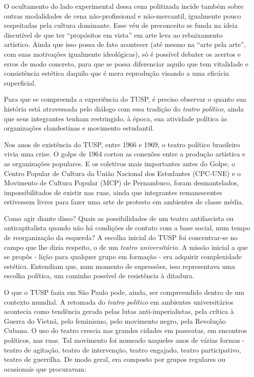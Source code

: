 O ocultamento do lado experimental dessa cena politizada incide também
sobre outras modalidades de cena não-profissional e não-mercantil,
igualmente pouco respeitadas pela cultura dominante. Esse véu de
preconceito se funda na ideia discutível de que ter “propósitos em
vista” em arte leva ao rebaixamento artístico. Ainda que isso possa de
fato acontecer (até mesmo na “arte pela arte”, com suas motivações
igualmente ideológicas), só é possível debater os acertos e erros de
modo concreto, para que se possa diferenciar aquilo que tem vitalidade e
consistência estética daquilo que é mera reprodução visando a uma
eficácia superficial.

Para que se compreenda a experiência do TUSP, é preciso observar o
quanto sua história está atravessada pelo diálogo com essa tradição do
\textit{teatro político}, ainda que seus integrantes tenham restringido, à
época, sua atividade política às organizações clandestinas e movimento
estudantil.

Nos anos de existência do TUSP, entre 1966 e 1969, o teatro político
brasileiro vivia uma crise. O golpe de 1964 cortou as conexões entre a
produção artística e as organizações populares. E os coletivos mais
importantes antes do Golpe, o Centro Popular de Cultura da União
Nacional dos Estudantes (CPC-UNE) e o Movimento de Cultura Popular (MCP)
de Pernambuco, foram desmantelados, impossibilitados de existir nas
ruas, ainda que integrantes remanescentes estivessem livres para fazer
uma arte de protesto em ambientes de classe média.

Como agir diante disso? Quais as possibilidades de um teatro
antifascista ou anticapitalista quando não há condições de contato com a
base social, num tempo de reorganização da esquerda? A escolha inicial
do TUSP foi concentrar-se no campo que lhe dizia respeito, o de um
\textit{teatro universitário}. A missão inicial a que se propôs - lição
para qualquer grupo em formação - era adquirir complexidade estética.
Entendiam que, num momento de supressões, isso representava uma escolha
política, um caminho possível de resistência à ditadura.

O que o TUSP fazia em São Paulo pode, ainda, ser compreendido dentro de
um contexto mundial. A retomada do \textit{teatro político} em ambientes
universitários acontecia como tendência gerada pelas lutas
anti-imperialistas, pela crítica à Guerra do Vietnã, pelo feminismo,
pelo movimento negro, pela Revolução Cubana. O uso do teatro crescia nas
grandes cidades em passeatas, em encontros políticos, nas ruas. Tal
movimento foi nomeado naqueles anos de várias formas - teatro de
agitação, teatro de intervenção, teatro engajado, teatro participativo,
teatro de guerrilha. De modo geral, era composto por grupos regulares ou
ocasionais que procuravam:

